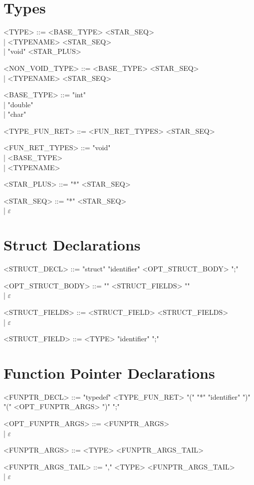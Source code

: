 \section{Types}
\begin{grammar}
      <TYPE> ::= <BASE\_TYPE> <STAR\_SEQ> \\
      | <TYPENAME> <STAR\_SEQ> \\
      | "void" <STAR\_PLUS>

      <NON\_VOID\_TYPE> ::= <BASE\_TYPE> <STAR\_SEQ> \\
      | <TYPENAME> <STAR\_SEQ>

      <BASE\_TYPE> ::= "int" \\
      | "double" \\
      | "char"

      <TYPE\_FUN\_RET> ::= <FUN\_RET\_TYPES> <STAR\_SEQ>

      <FUN\_RET\_TYPES> ::= "void" \\
      | <BASE\_TYPE> \\
      | <TYPENAME>

      <STAR\_PLUS> ::= "*" <STAR\_SEQ>

      <STAR\_SEQ> ::= "*" <STAR\_SEQ> \\
      | $\varepsilon$
\end{grammar}

\section{Struct Declarations}
\begin{grammar}
      <STRUCT\_DECL> ::= "struct" "identifier" <OPT\_STRUCT\_BODY> ";"

      <OPT\_STRUCT\_BODY> ::= "{" <STRUCT\_FIELDS> "}" \\
      | $\varepsilon$

      <STRUCT\_FIELDS> ::= <STRUCT\_FIELD> <STRUCT\_FIELDS> \\
      | $\varepsilon$

      <STRUCT\_FIELD> ::= <TYPE> "identifier" ";"
\end{grammar}

\section{Function Pointer Declarations}
\begin{grammar}
      <FUNPTR\_DECL> ::= "typedef" <TYPE\_FUN\_RET> "(" "*" "identifier" ")" "(" <OPT\_FUNPTR\_ARGS> ")" ";"

      <OPT\_FUNPTR\_ARGS> ::= <FUNPTR\_ARGS> \\
      | $\varepsilon$

      <FUNPTR\_ARGS> ::= <TYPE> <FUNPTR\_ARGS\_TAIL>

      <FUNPTR\_ARGS\_TAIL> ::= "," <TYPE> <FUNPTR\_ARGS\_TAIL> \\
      | $\varepsilon$
\end{grammar}

